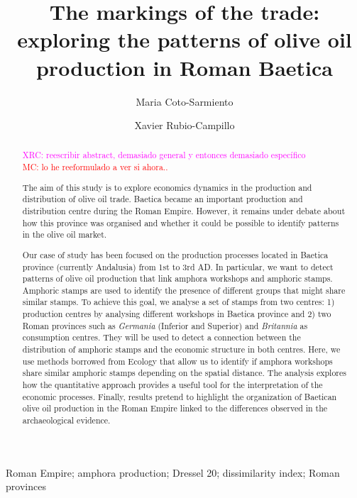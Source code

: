 \documentclass[review]{elsarticle}
\newcommand{\memo}[2]{\textcolor{#1}{#2}}
\newcommand{\maria}[1]{\memo{red}{MC: #1\\}}
\newcommand{\xavi}[1]{\memo{magenta}{XRC: #1\\}}
\begin{document}
\begin{frontmatter}

\title{The markings of the trade: exploring the patterns of olive oil production in Roman Baetica}

\author[ceipacadress]{Maria Coto-Sarmiento}


\author[edadress]{Xavier Rubio-Campillo}

\address[ceipacadress]{CEIPAC, Department of Prehistory and Archaeology, Montalegre, 6-8, 08001, University of Barcelona, Barcelona, Spain}
\address[edadress]{School of History, Classic \& Archaeology, Room OOM.33, William Robertson Wing, Old Medical School, Teviot Place, University of Edinburgh, UK}

\begin{keyword}
Roman Empire; amphora production; Dressel 20; dissimilarity index; Roman provinces
\end{keyword}


\begin{abstract}

\xavi{reescribir abstract, demasiado general y entonces demasiado específico}
\maria{lo he reeformulado a ver si ahora..}


The aim of this study is to explore economics dynamics in the production and distribution of olive oil trade. 
Baetica became an important production and distribution centre during the Roman Empire. However, it remains under debate about how this province was organised and whether it could be possible to identify patterns in the olive oil market. 

Our case of study has been focused on the production processes located in Baetica province (currently Andalusia) from 1st to 3rd AD. In particular, we want to detect patterns of olive oil production that link amphora workshops and amphoric stamps. Amphoric stamps are used to identify the presence of different groups that might share similar stamps. To achieve this goal, we analyse a set of stamps from two centres: 1) production centres by analysing different workshops in Baetica province and 2) two Roman provinces such as \textit{Germania} (Inferior and Superior) and \textit{Britannia} as consumption centres. They will be used to detect a connection between the distribution of amphoric stamps and the economic structure in both centres. Here, we use methods borrowed from Ecology that allow us to identify if amphora workshops share similar amphoric stamps depending on the spatial distance. The analysis explores how the quantitative approach provides a useful tool for the interpretation of the economic processes. Finally, results pretend to highlight the organization of Baetican olive oil production in the Roman Empire linked to the differences observed in the archaeological evidence.



\end{abstract}
\end{frontmatter}
\end{document}
